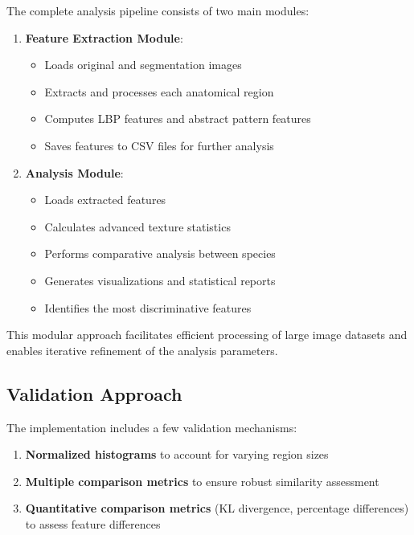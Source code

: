 \documentclass[a4paper,12pt]{report}
\begin{document}
The complete analysis pipeline consists of two main modules:

\begin{enumerate}
    \item \textbf{Feature Extraction Module}:
    \begin{itemize}
        \item Loads original and segmentation images
        \item Extracts and processes each anatomical region
        \item Computes LBP features and abstract pattern features
        \item Saves features to CSV files for further analysis
    \end{itemize}

    \item \textbf{Analysis Module}:
    \begin{itemize}
        \item Loads extracted features
        \item Calculates advanced texture statistics
        \item Performs comparative analysis between species
        \item Generates visualizations and statistical reports
        \item Identifies the most discriminative features
    \end{itemize}
\end{enumerate}

This modular approach facilitates efficient processing of large image datasets and enables iterative refinement of the analysis parameters.

\subsection{Validation Approach}

The implementation includes a few validation mechanisms:

\begin{enumerate}
    \item \textbf{Normalized histograms} to account for varying region sizes
    \item \textbf{Multiple comparison metrics} to ensure robust similarity assessment
    \item \textbf{Quantitative comparison metrics} (KL divergence, percentage differences) to assess feature differences
\end{enumerate}
\end{document}
